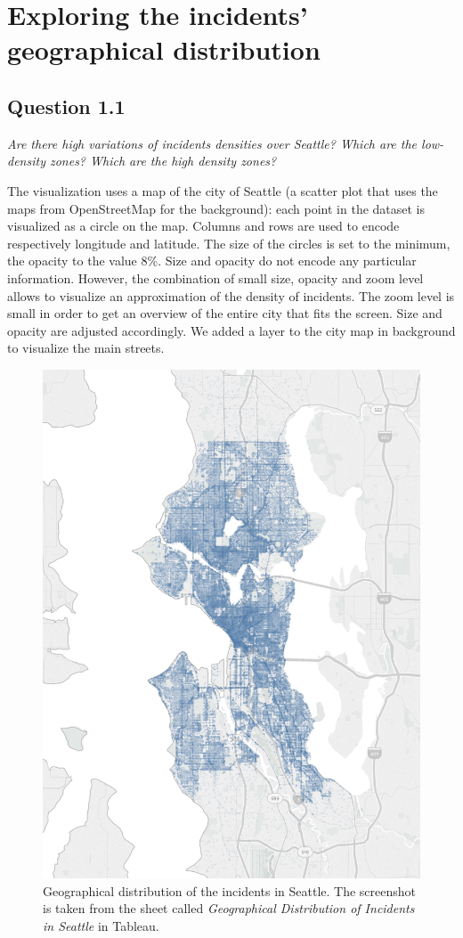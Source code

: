 \section{Exploring the incidents' geographical distribution}
\label{sec:question1}

\subsection*{Question 1.1}
\textit{Are there high variations of incidents densities over Seattle? Which are the low-density zones? Which are the high density zones?}

The visualization uses a map of the city of Seattle (a scatter plot that uses the maps from OpenStreetMap for the background):
each point in the dataset is visualized as a circle on the map.
Columns and rows are used to encode respectively longitude and latitude.
The size of the circles is set to the minimum, the opacity to the value $8\%$.
Size and opacity do not encode any particular information.
However, the combination of small size, opacity and zoom level allows to visualize an approximation of the density of incidents.
The zoom level is small in order to get an overview of the entire city that fits the screen.
Size and opacity are adjusted accordingly.
We added a layer to the city map in background to visualize the main streets.

\begin{figure}[h]
	\centering
	\includegraphics[width=.75\columnwidth]{figures/1_1_geographical_distribution_incidents}
	\caption{Geographical distribution of the incidents in Seattle. The screenshot is taken from the sheet called \textit{Geographical Distribution of Incidents in Seattle} in Tableau.}
	\label{fig:1_1_geographical_distribution_incidents}
\end{figure}

